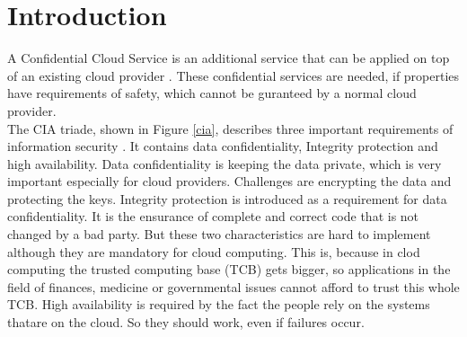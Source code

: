 \section{Introduction}
	A Confidential Cloud Service is an additional service that can be applied on top of an existing cloud provider \cite{confidentiality}. These confidential services are needed, if properties have requirements of safety, which cannot be guranteed by a normal cloud provider.   \\
	 The CIA triade,  shown in Figure \ref{cia},  describes three important requirements of information security \cite{ciaBook} \cite{cia}. It contains data confidentiality, Integrity protection and high availability. Data confidentiality is keeping the data private, which is very important especially for cloud providers. Challenges are encrypting the data and protecting the keys. Integrity protection is introduced as a requirement for data confidentiality. It is the ensurance of complete and correct code that is not changed by a bad party. But these two characteristics are hard to implement although they are mandatory for cloud computing. This is, because in clod computing the trusted computing base (TCB) gets bigger, so applications in the field of finances, medicine or governmental issues cannot afford to trust this whole TCB. High availability is required by the fact the people rely on the systems thatare on the cloud. So they should work, even if failures occur.\\
	 